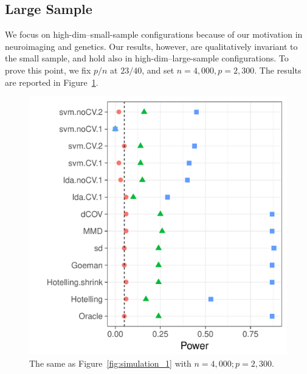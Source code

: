 \documentclass[onecolumn,draftclsnofoot]{IEEEtran}
\begin{document}
\subsection{Large Sample}
\label{sec:large-sample}

We focus on high-dim--small-sample configurations because of our motivation in neuroimaging and genetics. 
Our results, however, are qualitatively invariant to the small sample, and hold also in high-dim--large-sample configurations.
To prove this point, we fix $p/n$ at $23/40$, and set $n=4,000, p=2,300$. 
The results are reported in Figure~\ref{fig:large-sample}.


\begin{figure}[h]
	\centering
	\includegraphics[width=0.7\columnwidth]{"art/file1"}
	\caption{The same as Figure~\ref{fig:simulation_1} with $n=4,000; p=2,300$.}
	\label{fig:large-sample}
\end{figure}
\end{document}
